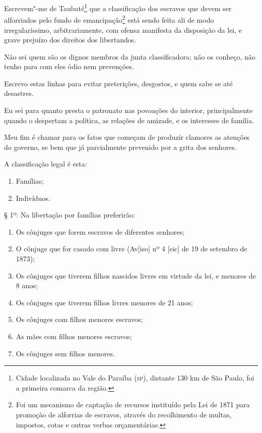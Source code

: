 Escrevem"-me de Taubaté\footnote{Cidade localizada no Vale do Paraíba
  (\textsc{sp}), distante 130 km de São Paulo, foi a primeira comarca da região.}
que a classificação dos escravos que devem ser alforriados pelo fundo de
emancipação\footnote{Foi um mecanismo de captação de recursos
  instituído pela Lei de 1871 para promoção de alforrias de escravos,
  através do recolhimento de multas, impostos, cotas e outras verbas
  orçamentárias.} está sendo feita ali de modo irregularíssimo,
arbitrariamente, com ofensa manifesta da disposição da lei, e grave
prejuízo dos direitos dos libertandos.

Não sei quem são os dignos membros da junta classificadora; não os
conheço, não tenho para com eles ódio nem prevenções.

Escrevo estas linhas para evitar preterições, desgostos, e quem sabe se
até desastres.

Eu sei para quanto presta o patronato nas povoações do interior,
principalmente quando o despertam a política, as relações de amizade, e
os interesses de família.

Meu fim é chamar para os fatos que começam de produzir clamores as
atenções do governo, se bem que já parcialmente prevenido por a grita
dos senhores.

A classificação legal é esta:

\begin{enumerate}[label={\scshape\roman*.}]
\item Famílias;

\item Indivíduos.
\end{enumerate}

§ 1º: Na libertação por famílias preferirão:
\begin{enumerate}[label={\scshape\roman*.}]
\item Os cônjuges que forem escravos de diferentes senhores;

\item O cônjuge que for casado com livre (Av{[}iso{]} nº 4 {[}sic{]} de 19
de setembro de 1873);

\item Os cônjuges que tiverem filhos nascidos livres em virtude da lei, e
menores de 8 anos;

\item Os cônjuges que tiverem filhos livres menores de 21 anos;

\item Os cônjuges com filhos menores escravos;

\item As mães com filhos menores escravos;

\item Os cônjuges sem filhos menores.
\end{enumerate}

